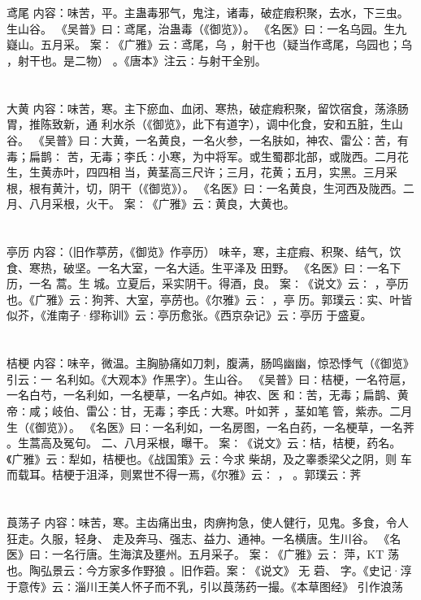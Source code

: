 \documentclass[12pt,UTF8]{ctexbook}
\begin{document}
\section{}鸢尾
内容：味苦，平。主蛊毒邪气，鬼注，诸毒，破症瘕积聚，去水，下三虫。生山谷。 
《吴普》曰∶鸢尾，治蛊毒（《御览》）。 
《名医》曰∶一名乌园。生九嶷山。五月采。 
案∶《广雅》云∶鸢尾，乌 ，射干也（疑当作鸢尾，乌园也；乌 ，射干也。是二物） 
。《唐本》注云∶与射干全别。 


\section{}大黄
内容：味苦，寒。主下瘀血、血闭、寒热，破症瘕积聚，留饮宿食，荡涤肠胃，推陈致新，通 
利水杀（《御览》，此下有道字），调中化食，安和五脏，生山谷。 
《吴普》曰∶大黄，一名黄良，一名火参，一名肤如，神农、雷公∶苦，有毒；扁鹊∶ 
苦，无毒；李氏∶小寒，为中将军。或生蜀郡北部，或陇西。二月花生，生黄赤叶，四四相 
当，黄茎高三尺许；三月，花黄；五月，实黑。三月采根，根有黄汁，切，阴干（《御览》）。 
《名医》曰∶一名黄良，生河西及陇西。二月、八月采根，火干。 
案∶《广雅》云∶黄良，大黄也。 


\section{}亭历
内容：（旧作葶苈，《御览》作亭历） 
味辛，寒，主症瘕、积聚、结气，饮食、寒热，破坚。一名大室，一名大适。生平泽及 
田野。 
《名医》曰∶一名下历，一名 蒿。生 城。立夏后，采实阴干。得酒，良。 
案∶《说文》云∶ ，亭历也。《广雅》云∶狗荠、大室，亭苈也。《尔雅》云∶ ，亭 
历。郭璞云∶实、叶皆似芥，《淮南子·缪称训》云∶亭历愈张。《西京杂记》云∶亭历 
于盛夏。 


\section{}桔梗
内容：味辛，微温。主胸胁痛如刀刺，腹满，肠鸣幽幽，惊恐悸气（《御览》引云∶一 
名利如。《大观本》作黑字）。生山谷。 
《吴普》曰∶桔梗，一名符扈，一名白芍，一名利如，一名梗草，一名卢如。神农、医 
和∶苦，无毒；扁鹊、黄帝∶咸；岐伯、雷公∶甘，无毒；李氏∶大寒。叶如荠 ，茎如笔 
管，紫赤。二月生（《御览》）。 
《名医》曰∶一名利如，一名房图，一名白药，一名梗草，一名荠 。生蒿高及冤句。 
二、八月采根，曝干。 
案∶《说文》云∶桔，桔梗，药名。《广雅》云∶犁如，桔梗也。《战国策》云∶今求 
柴胡，及之睾黍梁父之阴，则 车而载耳。桔梗于沮泽，则累世不得一焉，《尔雅》云∶ ， 
。郭璞云∶荠 


\section{}莨荡子
内容：味苦，寒。主齿痛出虫，肉痹拘急，使人健行，见鬼。多食，令人狂走。久服，轻身、 
走及奔马、强志、益力、通神。一名横唐。生川谷。 
《名医》曰∶一名行唐。生海滨及壅州。五月采子。 
案∶《广雅》云∶ 萍，KT 荡也。陶弘景云∶今方家多作野狼 。旧作菪。案∶《说文》 
无 
菪、 字。《史记·淳于意传》云∶淄川王美人怀子而不乳，引以莨荡药一撮。《本草图经》 
引作浪荡 
\end{document}
